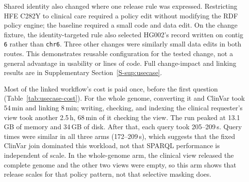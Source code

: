 \documentclass[pdflatex,sn-mathphys-num]{sn-jnl}
\begin{document}
Shared identity also changed where one release rule was expressed. 
Restricting HFE C282Y to clinical care required a policy edit without modifying the RDF policy engine; the baseline required a small code and data edit. 
On the change fixture, the identity-targeted rule also selected HG002's record written on contig \texttt{6} rather than \texttt{chr6}. 
Three other changes were similarly small data edits in both routes. 
This demonstrates reusable configuration for the tested change, not a general advantage in usability or lines of code. 
Full change-impact and linking results are in Supplementary Section~\ref{S-sup:usecase}.

Most of the linked workflow's cost is paid once, before the first question (Table~\ref{tab:usecase-cost}). 
For the whole genome, converting it and ClinVar took 54\,min and linking 8\,min; writing, checking, and indexing the clinical requester's view took another 2.5\,h, 68\,min of it checking the view. 
The run peaked at 13.1\,GB of memory and 34\,GB of disk. 
After that, each query took 205--209\,s. 
Query times were similar in all three arms (172--209\,s), which suggests that the fixed ClinVar join dominated this workload, not that SPARQL performance is independent of scale. 
In the whole-genome arm, the clinical view released the complete genome and the other two views were empty, so this arm shows that release scales for that policy pattern, not that selective masking does.
\end{document}
